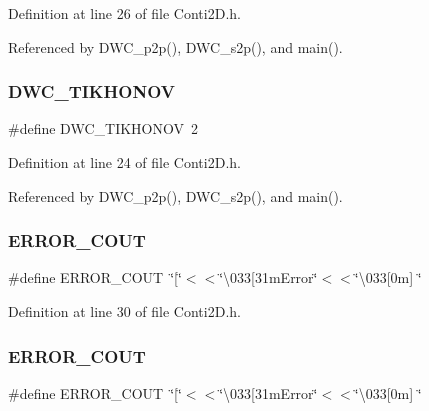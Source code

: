 Definition at line 26 of file Conti2\+D.\+h.



Referenced by D\+W\+C\+\_\+p2p(), D\+W\+C\+\_\+s2p(), and main().

\mbox{\label{Conti2D_8h_a600e2a1b514c2a21a9ce3e97637b65ae_a600e2a1b514c2a21a9ce3e97637b65ae}} 
\subsubsection{D\+W\+C\+\_\+\+T\+I\+K\+H\+O\+N\+OV}
{\footnotesize\ttfamily \#define D\+W\+C\+\_\+\+T\+I\+K\+H\+O\+N\+OV~2}



Definition at line 24 of file Conti2\+D.\+h.



Referenced by D\+W\+C\+\_\+p2p(), D\+W\+C\+\_\+s2p(), and main().

\mbox{\label{Conti2D_8h_a6200c444a92cd12d31ac6bdaf7c221d0_a6200c444a92cd12d31ac6bdaf7c221d0}} 
\subsubsection{E\+R\+R\+O\+R\+\_\+\+C\+O\+UT\hspace{0.1cm}{\footnotesize\ttfamily [1/2]}}
{\footnotesize\ttfamily \#define E\+R\+R\+O\+R\+\_\+\+C\+O\+UT~\char`\"{}[\char`\"{}$<$$<$\char`\"{}\textbackslash{}033[31m\+Error\char`\"{}$<$$<$\char`\"{}\textbackslash{}033[0m] \char`\"{}}



Definition at line 30 of file Conti2\+D.\+h.

\mbox{\label{Conti2D_8h_a6200c444a92cd12d31ac6bdaf7c221d0_a6200c444a92cd12d31ac6bdaf7c221d0}} 
\subsubsection{E\+R\+R\+O\+R\+\_\+\+C\+O\+UT\hspace{0.1cm}{\footnotesize\ttfamily [2/2]}}
{\footnotesize\ttfamily \#define E\+R\+R\+O\+R\+\_\+\+C\+O\+UT~\char`\"{}[\char`\"{}$<$$<$\char`\"{}\textbackslash{}033[31m\+Error\char`\"{}$<$$<$\char`\"{}\textbackslash{}033[0m] \char`\"{}}



